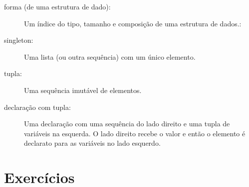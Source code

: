 \begin{description}
\item[forma (de uma estrutura de dado):] Um índice do tipo, tamanho e
composição de uma estrutura de dados.:

\item[singleton:] Uma lista (ou outra sequência) com um único elemento.

\item[tupla:] Uma sequência imutável de elementos.

\item[declaração com tupla:] Uma declaração com uma sequência do lado direito
e uma tupla de variáveis na esquerda. O lado direito recebe o valor e então o
elemento é declarato para as variáveis no lado esquerdo.

\end{description}


\section{Exercícios}

